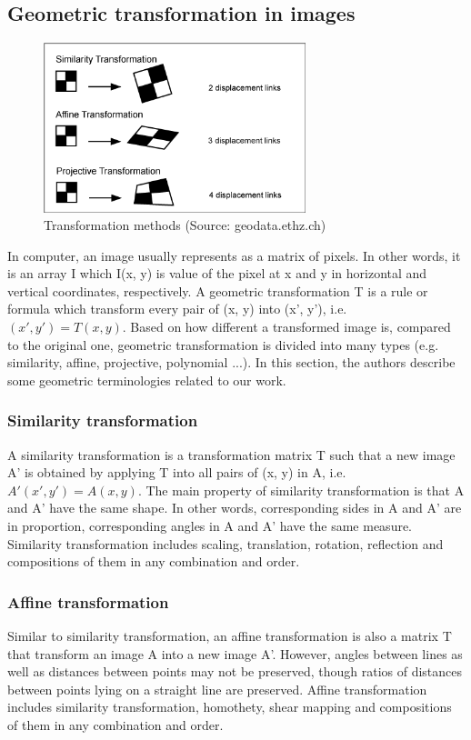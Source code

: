 \subsection{Geometric transformation in images} \label{section:geometric_transformation}

\begin{figure}
    \centering
    \includegraphics[width=3.0in]{transformation.png}
    \caption{Transformation methods (Source: geodata.ethz.ch)}
    \label{fig:image_houses}
\end{figure}

In computer, an image usually represents as a matrix of pixels. In other words, it is an array I which I(x, y) is value of the pixel at x and y in horizontal and vertical coordinates, respectively. A geometric transformation T is a rule or formula which transform every pair of (x, y) into (x', y'), i.e. $(x', y') = T(x, y)$. Based on how different a transformed image is, compared to the original one, geometric transformation is divided into many types (e.g. similarity, affine, projective, polynomial ...). In this section, the authors describe some geometric terminologies related to our work.

\subsubsection{Similarity transformation} A similarity transformation is a transformation matrix T such that a new image A' is obtained by applying T into all pairs of (x, y) in A, i.e. $A'(x', y') = A(x, y)$. The main property of similarity transformation is that A and A' have the same shape. In other words, corresponding sides in A and A' are in proportion, corresponding angles in A and A' have the same measure. Similarity transformation includes scaling, translation, rotation, reflection and compositions of them in any combination and order.

\subsubsection{Affine transformation} Similar to similarity transformation, an affine transformation is also a matrix T that transform an image A into a new image A'. However, angles between lines as well as distances between points may not be preserved, though ratios of distances between points lying on a straight line are preserved. Affine transformation includes similarity transformation, homothety, shear mapping and compositions of them in any combination and order.

